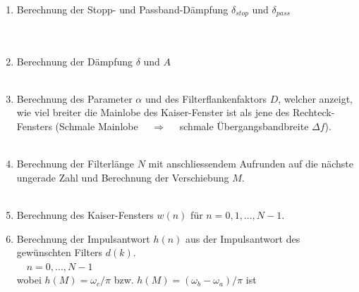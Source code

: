 \begin{enumerate}
\begin{tabular}{c|c}
		 \end{tabular}\\
		 \item Berechnung der Stopp- und Passband-Dämpfung $\delta_{stop}$ und $\delta_{pass}$\\[0.2cm]
		 $\qquad$\\[0.3cm]
		 \\[-0.1cm]
		 \item Berechnung der Dämpfung $\delta$ und $A$\\[0.2cm]
		 $\qquad$\\[-0.3cm]
		 \item Berechnung des Parameter $\alpha$ und des Filterflankenfaktors $D$, welcher anzeigt, wie viel breiter die Mainlobe des Kaiser-Fenster ist als jene des Rechteck-Fensters (Schmale Mainlobe $\quad\Rightarrow\quad$ schmale Übergangsbandbreite $\Delta f$).\\[0.2cm]
		 $\qquad$
		 \\[-0.1cm]
		 \item Berechnung der Filterlänge $N$ mit anschliessendem Aufrunden auf die nächste ungerade Zahl und Berechnung der Verschiebung $M$.\\[0.2cm]
		 $\qquad$$\qquad$\\[-0.05cm]
		 \item Berechnung des Kaiser-Fensters $w(n)$ für $n=0,1,...,N-1$.
		 \item Berechnung der Impulsantwort $h(n)$ aus der Impulsantwort des gewünschten Filters $d(k)$. \\[0.2cm]
		 $\quad n=0,...,N-1$\\[0.2cm]
		 wobei $h(M) = \omega_c/\pi$ bzw. $h(M) = (\omega_b-\omega_a)/\pi$ ist 
		\end{enumerate}
		
